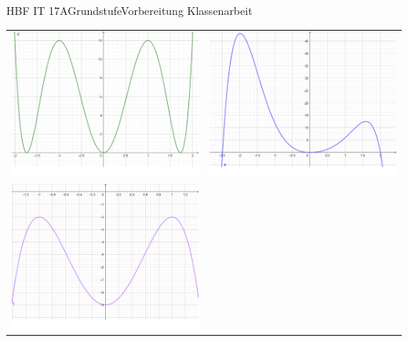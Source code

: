 \documentclass[oneside,openany,headings=optiontotoc,11pt,numbers=noenddot]{scrreprt}
\begin{document}
\begin{worksheet}{HBF IT 17A}{Grundstufe}{Vorbereitung Klassenarbeit}
\begin{framed}
\begin{tabularx}{\textwidth}{X|X}
				\includegraphics[scale=0.25]{Bilder/KAUebungBilder/d0.png} & \includegraphics[scale=0.25]{Bilder/KAUebungBilder/e0.png} \\
				\includegraphics[scale=0.25]{Bilder/KAUebungBilder/f0.png} &

\end{tabularx}
\end{framed}
\end{worksheet}
\end{document}
